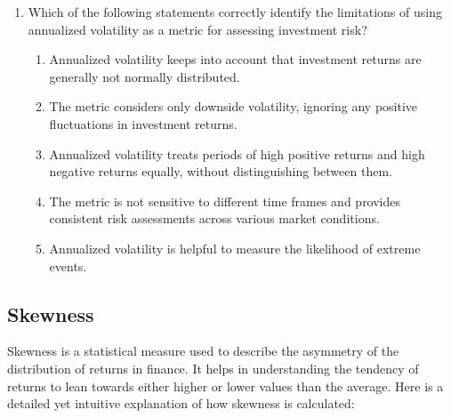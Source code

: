\documentclass{article}
\begin{document}
\begin{enumerate}
    \item Which of the following statements correctly identify the limitations of using annualized volatility as a metric for assessing investment risk?
        \begin{enumerate}
            \item Annualized volatility keeps into account that investment returns are generally not normally distributed.
            \item The metric considers only downside volatility, ignoring any positive fluctuations in investment returns.
            \item Annualized volatility treats periods of high positive returns and high negative returns equally, without distinguishing between them.
            \item The metric is not sensitive to different time frames and provides consistent risk assessments across various market conditions.
            \item Annualized volatility is helpful to measure the likelihood of extreme events.
        \end{enumerate}
    
\end{enumerate}

\clearpage

\subsection{Skewness}

Skewness is a statistical measure used to describe the asymmetry of the distribution of returns in finance. It helps in understanding the tendency of returns to lean towards either higher or lower values than the average. Here is a detailed yet intuitive explanation of how skewness is calculated:
\end{document}

